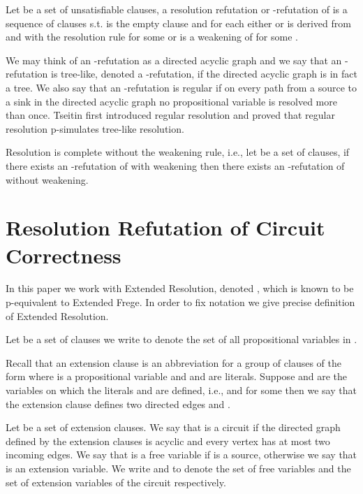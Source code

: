 \documentclass{LMCS}
\theoremstyle{plain}\newtheorem{satz}[thm]{Satz}
\begin{document}
Let  be a set of unsatisfiable clauses, a resolution refutation or -refutation of  is a sequence of clauses  s.t.  is the empty clause and for each  either  or  is derived from  and  with the resolution rule for some  or  is a weakening of  for some .

We may think of an -refutation as a directed acyclic graph and we say that an -refutation is tree-like, denoted a -refutation, if the directed acyclic graph is in fact a tree. We also say that an -refutation is regular if on every path from a source to a sink in the directed acyclic graph no propositional variable is resolved more than once. Tseitin \cite{0205.00402} first introduced regular resolution and proved that regular resolution p-simulates tree-like resolution.

Resolution is complete without the weakening rule, i.e., let  be a set of clauses, if there exists an -refutation of  with weakening then there exists an -refutation of  without weakening.

\section{Resolution Refutation of Circuit Correctness}
\label{s_circuit}

In this paper we work with Extended Resolution, denoted , which is known to be p-equivalent to Extended Frege. In order to fix notation we give precise definition of Extended Resolution.

\begin{defi}
Let  be a set of clauses we write  to denote the set of all propositional variables in .
\end{defi}

Recall that an extension clause  is an abbreviation for a group of clauses of the form  where  is a propositional variable and  and  are literals. Suppose  and  are the variables on which the literals  and  are defined, i.e.,  and  for some  then we say that the extension clause  defines two directed edges  and .

\begin{defi}
Let  be a set of extension clauses. We say that  is a circuit if the directed graph defined by the extension clauses is acyclic and every vertex has at most two incoming edges. We say that  is a free variable if  is a source, otherwise we say that  is an extension variable. We write  and  to denote the set of free variables and the set of extension variables of the circuit  respectively.
\end{defi}
\end{document}

